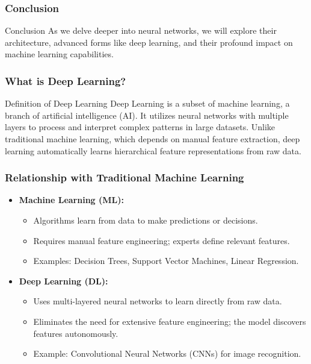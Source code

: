 \documentclass[aspectratio=169]{beamer}
\begin{document}
\begin{frame}[fragile]
    \frametitle{Conclusion}
    \begin{block}{Conclusion}
        As we delve deeper into neural networks, we will explore their architecture, advanced forms like deep learning, and their profound impact on machine learning capabilities.
    \end{block}
\end{frame}

\begin{frame}[fragile]
    \frametitle{What is Deep Learning?}
    
    \begin{block}{Definition of Deep Learning}
        Deep Learning is a subset of machine learning, a branch of artificial intelligence (AI). It utilizes neural networks with multiple layers to process and interpret complex patterns in large datasets. Unlike traditional machine learning, which depends on manual feature extraction, deep learning automatically learns hierarchical feature representations from raw data.
    \end{block}
\end{frame}

\begin{frame}[fragile]
    \frametitle{Relationship with Traditional Machine Learning}
    
    \begin{itemize}
        \item \textbf{Machine Learning (ML):}
        \begin{itemize}
            \item Algorithms learn from data to make predictions or decisions.
            \item Requires manual feature engineering; experts define relevant features.
            \item Examples: Decision Trees, Support Vector Machines, Linear Regression.
        \end{itemize}
        
        \item \textbf{Deep Learning (DL):}
        \begin{itemize}
            \item Uses multi-layered neural networks to learn directly from raw data.
            \item Eliminates the need for extensive feature engineering; the model discovers features autonomously.
            \item Example: Convolutional Neural Networks (CNNs) for image recognition.
        \end{itemize}
    \end{itemize}
\end{frame}
\end{document}
